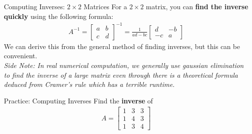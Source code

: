 \begin{frame}{Computing Inverses: $2 \times 2$ Matrices}
    For a $2 \times 2$ matrix, you can \textbf{find the inverse quickly} using the following formula:
    \begin{align*}
        A^{-1} = \begin{bmatrix}
            a & b \\
            c & d
        \end{bmatrix}^{-1} = \frac{1}{ad - bc}
        \begin{bmatrix}
            d & -b \\
            -c & a
        \end{bmatrix}
    \end{align*}
    We can derive this from the general method of finding inverses, but this can be convenient. \\[3ex]
    \textit{Side Note: In real numerical computation, we generally use gaussian elimination to find the inverse of a large matrix even through there is a theoretical formula deduced from Cramer’s rule which has a terrible runtime.}

\end{frame}

\begin{frame}{Practice: Computing Inverses}
    Find the \textbf{inverse} of
    \begin{align*}
        A = \begin{bmatrix}
            1 & 3 & 3 \\
            1 & 4 & 3 \\
            1 & 3 & 4
        \end{bmatrix}
    \end{align*}
\end{frame}

